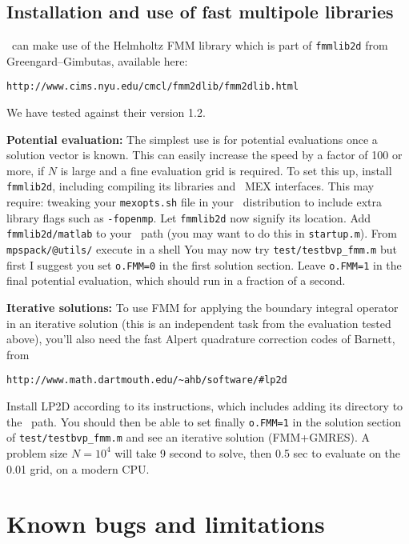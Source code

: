 \documentclass[12pt]{article}
\begin{document}
\subsection{Installation and use of fast multipole libraries}
\label{s:fmm}

\mpspack\ can make use of the Helmholtz FMM library
which is part of {\tt fmmlib2d} from Greengard--Gimbutas, available here:
\begin{verbatim}
http://www.cims.nyu.edu/cmcl/fmm2dlib/fmm2dlib.html
\end{verbatim}
We have tested against their version 1.2.

{\bf Potential evaluation:}
The simplest use is for potential evaluations once a solution vector is known.
This can easily increase the speed by a factor of 100 or more,
if $N$ is large and a fine evaluation grid is required.
To set this up, install {\tt fmmlib2d}, including compiling its
libraries and \matlab\ MEX interfaces. This may require:
tweaking your {\tt mexopts.sh} file in your \matlab\ distribution
to include extra library flags such as {\tt -fopenmp}.
Let {\tt fmmlib2d} now signify its
location.
Add {\tt fmmlib2d/matlab} to your \matlab\ path (you may want to do this
in {\tt startup.m}).
From {\tt mpspack/@utils/} execute in a shell
You may now try \verb+test/testbvp_fmm.m+
but first I suggest you set {\tt o.FMM=0} in the first solution section.
Leave {\tt o.FMM=1} in the final potential evaluation, which
should run in a fraction of a second.

{\bf Iterative solutions:}
To use FMM for applying the boundary integral operator in an
iterative solution (this is an independent task from the
evaluation tested above),
you'll also need the fast Alpert quadrature correction codes of Barnett, from
\begin{verbatim}
http://www.math.dartmouth.edu/~ahb/software/#lp2d
\end{verbatim}
Install LP2D according to its instructions,
which includes adding its directory to the \matlab\ path.
You should then be able to set finally {\tt o.FMM=1} in the solution
section of \verb+test/testbvp_fmm.m+
and see an iterative solution (FMM+GMRES). A problem size
$N=10^4$ will take 9 second
to solve, then 0.5 sec to evaluate on the 0.01 grid, on a modern CPU.



\section{Known bugs and limitations}
\end{document}
